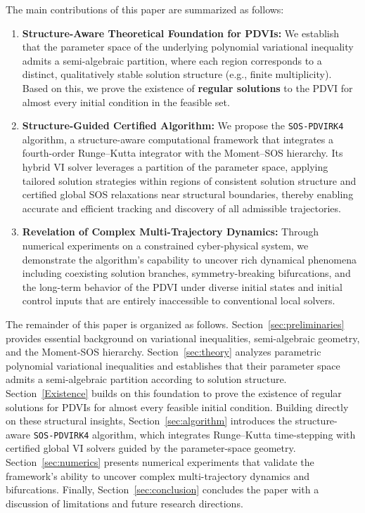\documentclass[sn-basic,Numbered]{sn-jnl}
\theoremstyle{thmstyleone}%
\begin{document}
The main contributions of this paper are summarized as follows:
\begin{enumerate}
    \item \textbf{Structure-Aware Theoretical Foundation for PDVIs:} We establish that the parameter space of the underlying polynomial variational inequality admits a semi-algebraic partition, where each region corresponds to a distinct, qualitatively stable solution structure (e.g., finite multiplicity). Based on this, we prove the existence of \textbf{regular solutions} to the PDVI for almost every initial condition in the feasible set.


    \item \textbf{Structure-Guided Certified Algorithm:} We propose the \texttt{SOS-PDVIRK4} algorithm, a structure-aware computational framework that integrates a fourth-order Runge--Kutta integrator with the Moment--SOS hierarchy. Its hybrid VI solver leverages a partition of the parameter space, applying tailored solution strategies within regions of consistent solution structure and certified global SOS relaxations near structural boundaries, thereby enabling accurate and efficient tracking and discovery of all admissible trajectories.

    \item \textbf{Revelation of Complex Multi-Trajectory Dynamics:} Through numerical experiments on a constrained cyber-physical system, we demonstrate the algorithm's capability to uncover rich dynamical phenomena including coexisting solution branches, symmetry-breaking bifurcations, and the long-term behavior of the PDVI under diverse initial states and initial control inputs that are entirely inaccessible to conventional local solvers.
\end{enumerate}

The remainder of this paper is organized as follows. Section~\ref{sec:preliminaries} provides essential background on variational inequalities, semi-algebraic geometry, and the Moment-SOS hierarchy. Section~\ref{sec:theory} analyzes parametric polynomial variational inequalities and establishes that their parameter space admits a semi-algebraic partition according to solution structure. Section~\ref{Existence} builds on this foundation to prove the existence of regular solutions for PDVIs for almost every feasible initial condition. Building directly on these structural insights, Section~\ref{sec:algorithm} introduces the structure-aware \texttt{SOS-PDVIRK4} algorithm, which integrates Runge–Kutta time-stepping with certified global VI solvers guided by the parameter-space geometry. Section~\ref{sec:numerics} presents numerical experiments that validate the framework’s ability to uncover complex multi-trajectory dynamics and bifurcations. Finally, Section~\ref{sec:conclusion} concludes the paper with a discussion of limitations and future research directions.
\end{document}
